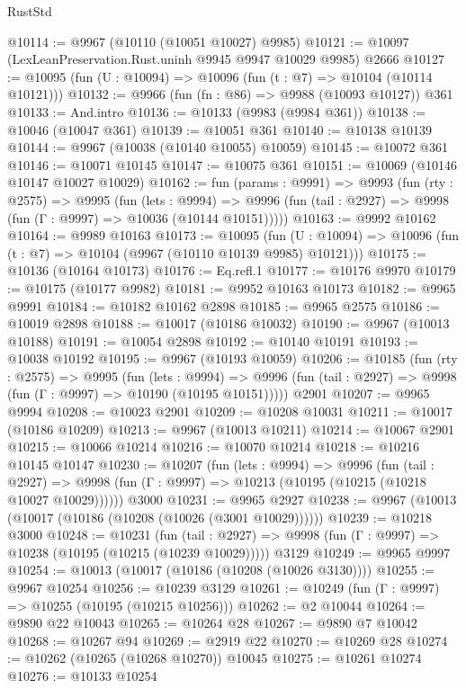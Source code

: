 \begin{lexlean}{RustStd}
\begin{coremodule}
{\begin{coremodule}
{{{{{{{{{{{{{{{{{{{{{{{{{{{{{{{{{{{{{{{{{{{{{{{{{{{{{{{{{{{{{{{{{{{{{{{{{{{{{{@10114 := @9967 (@10110 (@10051 @10027) @9985)
@10121 := @10097 (LexLeanPreservation.Rust.uninh @9945 @9947 @10029 @9985) @2666
@10127 := @10095 (fun (U : @10094) => @10096 (fun (t : @7) => @10104 (@10114 @10121)))
@10132 := @9966 (fun (fn : @86) => @9988 (@10093 @10127)) @361
@10133 := And.intro
@10136 := @10133 (@9983 (@9984 @361))
@10138 := @10046 (@10047 @361)
@10139 := @10051 @361
@10140 := @10138 @10139
@10144 := @9967 (@10038 (@10140 @10055) @10059)
@10145 := @10072 @361
@10146 := @10071 @10145
@10147 := @10075 @361
@10151 := @10069 (@10146 @10147 @10027 @10029)
@10162 := fun (params : @9991) =>
  @9993
    (fun (rty : @2575) =>
    @9995
      (fun (lets : @9994) =>
      @9996 (fun (tail : @2927) => @9998 (fun (Γ : @9997) => @10036 (@10144 @10151)))))
@10163 := @9992 @10162
@10164 := @9989 @10163
@10173 := @10095
    (fun (U : @10094) => @10096 (fun (t : @7) => @10104 (@9967 (@10110 @10139 @9985) @10121)))
@10175 := @10136 (@10164 @10173)
@10176 := Eq.refl.{1}
@10177 := @10176 @9970
@10179 := @10175 (@10177 @9982)
@10181 := @9952 @10163 @10173
@10182 := @9965 @9991
@10184 := @10182 @10162 @2898
@10185 := @9965 @2575
@10186 := @10019 @2898
@10188 := @10017 (@10186 @10032)
@10190 := @9967 (@10013 @10188)
@10191 := @10054 @2898
@10192 := @10140 @10191
@10193 := @10038 @10192
@10195 := @9967 (@10193 @10059)
@10206 := @10185
    (fun (rty : @2575) =>
    @9995
      (fun (lets : @9994) =>
      @9996 (fun (tail : @2927) => @9998 (fun (Γ : @9997) => @10190 (@10195 @10151)))))
    @2901
@10207 := @9965 @9994
@10208 := @10023 @2901
@10209 := @10208 @10031
@10211 := @10017 (@10186 @10209)
@10213 := @9967 (@10013 @10211)
@10214 := @10067 @2901
@10215 := @10066 @10214
@10216 := @10070 @10214
@10218 := @10216 @10145 @10147
@10230 := @10207
    (fun (lets : @9994) =>
    @9996
      (fun (tail : @2927) =>
      @9998 (fun (Γ : @9997) => @10213 (@10195 (@10215 (@10218 @10027 @10029))))))
    @3000
@10231 := @9965 @2927
@10238 := @9967 (@10013 (@10017 (@10186 (@10208 (@10026 (@3001 @10029))))))
@10239 := @10218 @3000
@10248 := @10231
    (fun (tail : @2927) => @9998 (fun (Γ : @9997) => @10238 (@10195 (@10215 (@10239 @10029)))))
    @3129
@10249 := @9965 @9997
@10254 := @10013 (@10017 (@10186 (@10208 (@10026 @3130))))
@10255 := @9967 @10254
@10256 := @10239 @3129
@10261 := @10249 (fun (Γ : @9997) => @10255 (@10195 (@10215 @10256)))
@10262 := @2 @10044
@10264 := @9890 @22 @10043
@10265 := @10264 @28
@10267 := @9890 @7 @10042
@10268 := @10267 @94
@10269 := @2919 @22
@10270 := @10269 @28
@10274 := @10262 (@10265 (@10268 @10270)) @10045
@10275 := @10261 @10274
@10276 := @10133 @10254
}}}}}}}}}}}}}}}}}}}}}}}}}}}}}}}}}}}}}}}}}}}}}}}}}}}}}}}}}}}}}}}}}}}}}}}}}}}}}}
\end{coremodule}}
\end{coremodule}
\end{lexlean}

